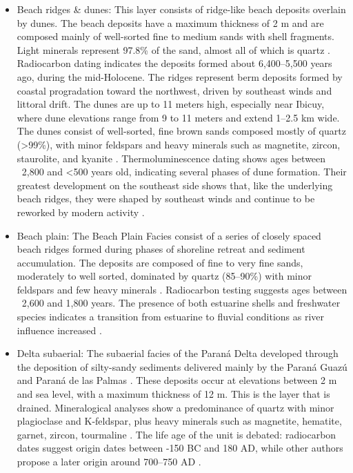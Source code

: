 \begin{itemize}
    \item Beach ridges \& dunes: This layer consists of ridge-like beach deposits overlain by dunes. The beach deposits have a maximum thickness of 2 m and are composed mainly of well-sorted fine to medium sands with shell fragments. Light minerals represent 97.8\% of the sand, almost all of which is quartz \autocite{cordiniContribucionConocimientoGeologia1949}. Radiocarbon dating indicates the deposits formed about 6,400–5,500 years ago, during the mid-Holocene. The ridges represent berm deposits formed by coastal progradation toward the northwest, driven by southeast winds and littoral drift.
    The dunes are up to 11 meters high, especially near Ibicuy, where dune elevations range from 9 to 11 meters and extend 1–2.5 km wide. The dunes consist of well-sorted, fine brown sands composed mostly of quartz (>99\%), with minor feldspars and heavy minerals such as magnetite, zircon, staurolite, and kyanite \autocite{cordiniContribucionConocimientoGeologia1949}. Thermoluminescence dating shows ages between ~2,800 and <500 years old, indicating several phases of dune formation. Their greatest development on the southeast side shows that, like the underlying beach ridges, they were shaped by southeast winds and continue to be reworked by modern activity \autocite{cavallottoEvolucionCambiosAmbientales2005}.

    \item Beach plain: The Beach Plain Facies consist of a series of closely spaced beach ridges formed during phases of shoreline retreat and sediment accumulation. The deposits are composed of fine to very fine sands, moderately to well sorted, dominated by quartz (85–90\%) with minor feldspars and few heavy minerals \autocite{cordiniContribucionConocimientoGeologia1949}. Radiocarbon testing suggests ages between ~2,600 and 1,800 years. The presence of both estuarine shells and freshwater species indicates a transition from estuarine to fluvial conditions as river influence increased \autocite{cavallottoEvolucionCambiosAmbientales2005}.

    \item Delta subaerial: The subaerial facies of the Paraná Delta developed through the deposition of silty-sandy sediments delivered mainly by the Paraná Guazú and Paraná de las Palmas \autocite{cavallottoEvolucionCambiosAmbientales2005}. These deposits occur at elevations between 2 m and sea level, with a maximum thickness of 12 m. This is the layer that is drained.
    Mineralogical analyses show a predominance of quartz with minor plagioclase and K-feldspar, plus heavy minerals such as magnetite, hematite, garnet, zircon, tourmaline \autocite{cavallottoEvolucionCambiosAmbientales2005}. The life age of the unit is debated: radiocarbon dates suggest origin dates between -150 BC and 180 AD, while other authors propose a later origin around 700–750 AD \autocite{cavallottoEvolucionCambiosAmbientales2005}.
    

\end{itemize}
